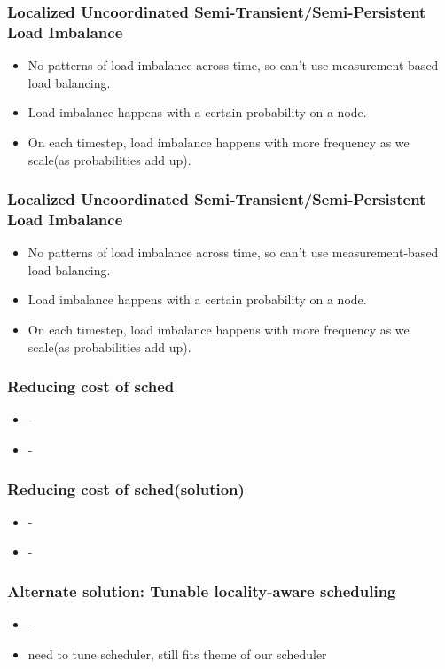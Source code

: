 \begin{frame} 
\frametitle{Localized Uncoordinated Semi-Transient/Semi-Persistent Load Imbalance}
\begin{itemize}
\item \small No patterns of load imbalance across time, so can't use measurement-based load balancing.
\item \small Load imbalance happens with a certain probability on a node.
\item \small On each timestep, load imbalance happens with more frequency as we scale(as probabilities add up).
\end{itemize}
\end{frame}


\begin{frame} 
\frametitle{Localized Uncoordinated Semi-Transient/Semi-Persistent Load Imbalance}
\begin{itemize}
\item \small No patterns of load imbalance across time, so can't use measurement-based load balancing.
\item \small Load imbalance happens with a certain probability on a node.
\item \small On each timestep, load imbalance happens with more frequency as we scale(as probabilities add up).
\end{itemize}
\end{frame}


\begin{frame} 
\frametitle{Reducing cost of sched}
\begin{itemize}
\item \small -
\item \small -
\end{itemize}
\end{frame}

\begin{frame} 
\frametitle{Reducing cost of sched(solution)}
\begin{itemize}
\item \small -
\item \small -
\end{itemize}
\end{frame}


\begin{frame} 
\frametitle{Alternate solution: Tunable locality-aware scheduling}
\begin{itemize}
\item \small -
\item \small need to tune scheduler, still fits theme of our scheduler
\end{itemize}
\end{frame}


